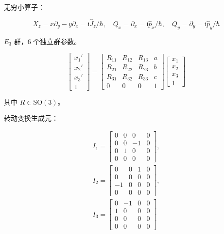 无穷小算子：

\begin{equation}
X_z
=x\partial_y-y\partial_x
=\mathrm{i}\hat{J}_z/\hbar,\quad
Q_x
=\partial_x
=\mathrm{i}\hat{p}_x/\hbar,\quad
Q_y
=\partial_y
=\mathrm{i}\hat{p}_y/\hbar
\end{equation}

$E_3$ 群，$6$ 个独立群参数。

\begin{equation}
\begin{bmatrix}
x_1' \\
x_2' \\
x_3' \\
1
\end{bmatrix}
=\begin{bmatrix}
R_{11} &R_{12} &R_{13} &a \\
 R_{21} &R_{22} &R_{23} &b \\
 R_{31} &R_{32} &R_{33} &c \\
 0 &0 &0 &1
\end{bmatrix}
\begin{bmatrix}
x_1 \\
x_2 \\
x_3 \\
1
\end{bmatrix}
\end{equation}

其中 $R\in\mathrm{SO}\left(3\right)$。

转动变换生成元：

\begin{gather}
I_1
=\begin{bmatrix}
0 &0 &0 &0 \\
0 &0 &-1 &0 \\
0 &1 &0 &0 \\
0 &0 &0 &0
\end{bmatrix},\\
I_2
=\begin{bmatrix}
0 &0 &1 &0 \\
0 &0 &0 &0 \\
-1 &0 &0 &0 \\
0 &0 &0 &0
\end{bmatrix},\\
I_3
=\begin{bmatrix}
0 &-1 &0 &0 \\
1 &0 &0 &0 \\
0 &0 &0 &0 \\
0 &0 &0 &0
\end{bmatrix}
\end{gather}


